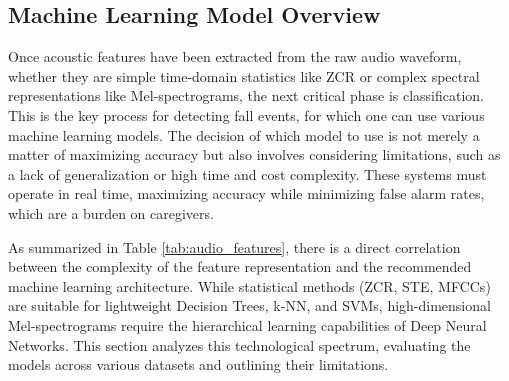 \documentclass[11pt, a4paper, twoside]{article}
\begin{document}
\subsection{Machine Learning Model Overview}
\label{machi}
\label{mlm}
Once acoustic features have been 
extracted from the raw audio waveform, whether they are simple time-domain statistics like ZCR or complex spectral representations like Mel-spectrograms, the next critical phase is classification. This is the key process for detecting fall events, for which one can use various machine learning models. The decision of which model to use is not merely a matter of maximizing accuracy but also involves considering limitations, such as a lack of generalization or high time and cost complexity. These systems must operate in real time, maximizing accuracy while minimizing false alarm rates, which are a burden on caregivers.

As summarized in Table \ref{tab:audio_features}, there is a direct correlation between the complexity of the feature representation and the recommended machine learning architecture. While statistical methods (ZCR, STE, MFCCs) are suitable for lightweight Decision Trees, k-NN, and SVMs, high-dimensional Mel-spectrograms require the hierarchical learning capabilities of Deep Neural Networks. This section analyzes this technological spectrum, evaluating the models across various datasets and outlining their limitations.
\end{document}
